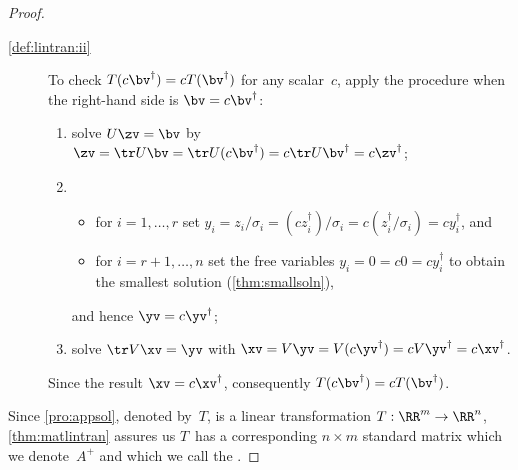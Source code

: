 \begin{proof}
\begin{description}
\item[\ref{def:lintran:ii}]  
To check \(T(c\bv^\dag)=cT(\bv^\dag)\) for any scalar~\(c\), apply the procedure when the right-hand side is \(\bv=c\bv^\dag\):
\begin{enumerate}
\item solve \(U\zv=\bv\) by \(\zv=\tr U\bv=\tr U(c\bv^\dag)=c\tr U\bv^\dag=c\zv^\dag\);
\item \begin{itemize}
\item for \(i=1,\ldots,r\) set \(y_i=z_i/\sigma_i=(cz^\dag_i)/\sigma_i=c(z^\dag_i/\sigma_i)=cy^\dag_i\), and
\item for \(i=r+1,\ldots,n\) set the free variables \(y_i=0=c0=cy^\dag_i\) to obtain the smallest solution (\cref{thm:smallsoln}),
\end{itemize}
and hence \(\yv=c\yv^\dag\);
\item solve \(\tr V\xv=\yv\) with \(\xv=V\yv=V(c\yv^\dag)=cV\yv^\dag=c\xv^\dag\).
\end{enumerate}
Since the result \(\xv=c\xv^\dag\), consequently \(T(c\bv^\dag)=cT(\bv^\dag)\).
\end{description}
Since \cref{pro:appsol}, denoted by~\(T\), is a linear transformation \(T:\RR^m\to\RR^n\), \cref{thm:matlintran} assures us \(T\)~has a corresponding \(n\times m\) standard matrix which we denote~\(A^+\) and which we call the .
\end{proof}




